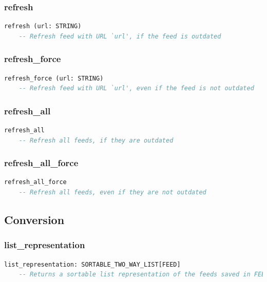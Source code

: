 \subsubsection{refresh}

\begin{lstlisting}[language=Eiffel]
refresh (url: STRING)
    -- Refresh feed with URL `url', if the feed is outdated
\end{lstlisting}

\subsubsection{refresh\_force}

\begin{lstlisting}[language=Eiffel]
refresh_force (url: STRING)
    -- Refresh feed with URL `url', even if the feed is not outdated
\end{lstlisting}

\subsubsection{refresh\_all}

\begin{lstlisting}[language=Eiffel]
refresh_all
    -- Refresh all feeds, if they are outdated
\end{lstlisting}

\subsubsection{refresh\_all\_force}

\begin{lstlisting}[language=Eiffel]
refresh_all_force
    -- Refresh all feeds, even if they are not outdated
\end{lstlisting}


\subsection{Conversion}
\label{sec:feed-manager-conversion}

\subsubsection{list\_representation}

\begin{lstlisting}[language=Eiffel]
list_representation: SORTABLE_TWO_WAY_LIST[FEED]
    -- Returns a sortable list representation of the feeds saved in FEED_MANAGER
\end{lstlisting}


